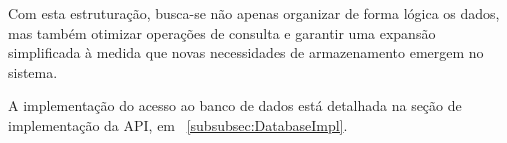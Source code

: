 Com esta estruturação, busca-se não apenas organizar de forma lógica os dados, mas também otimizar operações de consulta e garantir uma expansão simplificada à medida que novas necessidades de armazenamento emergem no sistema. 

A implementação do acesso ao banco de dados está detalhada na seção de implementação da API, em ~\ref{subsubsec:DatabaseImpl}.



